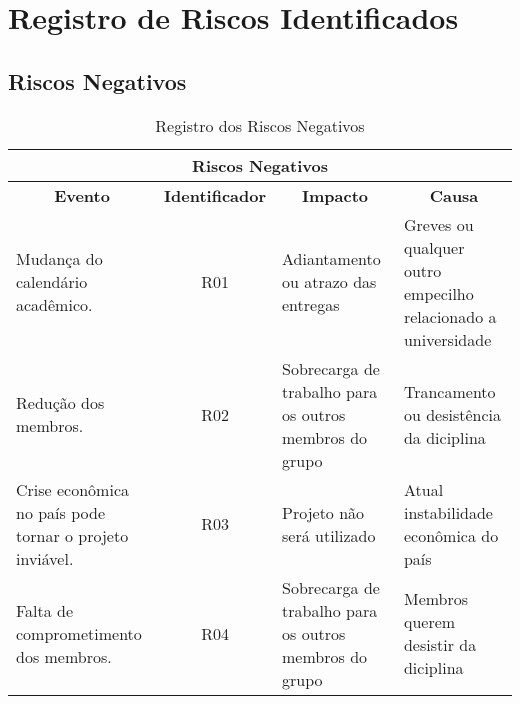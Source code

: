 \pagebreak

\section{Registro de Riscos Identificados}
\subsection{Riscos Negativos}
\begin{table}[h]
  \centering
  \caption{Registro dos Riscos Negativos}
  \begin{tabular}{|l|c|l|l|}
    \hline
    \multicolumn{4}{|c|}{\textbf{Riscos Negativos}}                                                                                                                                                                                                               \\ \hline
    \multicolumn{1}{|c|}{\textbf{Evento}}                          & \textbf{Identificador} & \multicolumn{1}{c|}{\textbf{Impacto}}                                    & \multicolumn{1}{c|}{\textbf{Causa}}                                                      \\ \hline
    \parbox[t]{5cm}{Mudança do calendário acadêmico.}                               & R01                    & \parbox[t]{4cm}{Adiantamento ou atrazo das entregas}                                      & \parbox[t]{4cm}{Greves ou qualquer outro empecilho relacionado a universidade}                            \\ \hline
    Redução dos membros.                                           & R02                    & \parbox[t]{4cm}{Sobrecarga de trabalho para os outros membros do grupo}                   & \parbox[t]{4cm}{Trancamento ou desistência da diciplina}                                                  \\ \hline
    \parbox[t]{5cm}{Crise econômica no país pode tornar o projeto inviável.}        & R03                    & \parbox[t]{4cm}{Projeto não será utilizado}                                               & \parbox[t]{4cm}{Atual instabilidade econômica do país}                                                    \\ \hline
    \parbox[t]{5cm}{Falta de comprometimento dos membros.}                          & R04                    & \parbox[t]{4cm}{Sobrecarga de trabalho para os outros membros do grupo}                   & \parbox[t]{4cm}{Membros querem desistir da diciplina}                                                     \\ \hline

\end{tabular}
\end{table}
